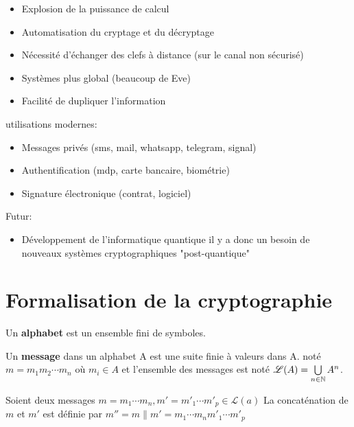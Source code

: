 \documentclass[a4paper, 12pt]{article}
\begin{document}
\begin{itemize}
    \item Explosion de la puissance de calcul
    \item Automatisation du cryptage et du décryptage
    \item Nécessité d'échanger des clefs à distance (sur le canal non sécurisé)
    \item Systèmes plus global (beaucoup de Eve)
    \item Facilité de dupliquer l'information
\end{itemize}

utilisations modernes:

\begin{itemize}
    \item Messages privés (sms, mail, whatsapp, telegram, signal)
    \item Authentification (mdp, carte bancaire, biométrie)
    \item Signature électronique (contrat, logiciel)
\end{itemize}

Futur:
\begin{itemize}
    \item Développement de l'informatique quantique
    il y a donc un besoin de nouveaux systèmes cryptographiques "post-quantique"
\end{itemize}

\section{Formalisation de la cryptographie}

\begin{definition}
    Un \textbf{alphabet} est un ensemble fini de symboles.
\end{definition}

\begin{definition}
    Un \textbf{message} dans un alphabet A est une suite finie à valeurs dans A.\n
    noté $m = m_1 m_2 \cdots m_n$ où $m_i \in A$ et l'ensemble des messages est noté $\mathscr{L}(A) = \bigcup\limits_{n \in \mathbb{N}} A^n$.
\end{definition}

\begin{definition}
    Soient deux messages $m = m_1 \cdots m_n, m' = m'_1 \cdots m'_p \in \mathscr{L}(a)$\n
    La concaténation de $m$ et $m'$ est définie par $m'' = m \| m' = m_1 \cdots m_n m'_1 \cdots m'_p$
\end{definition}
\end{document}
